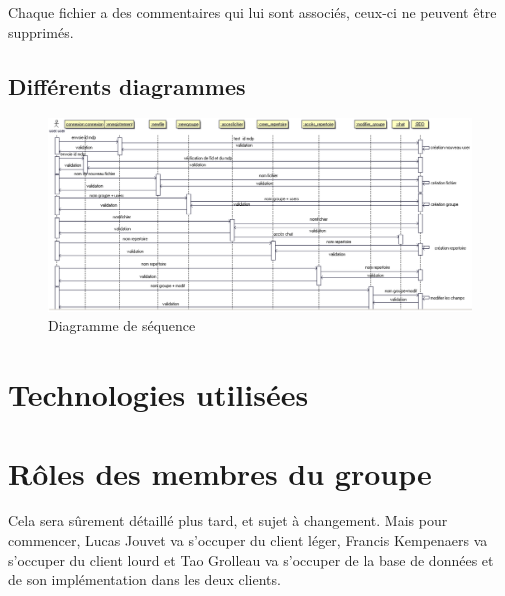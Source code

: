 \documentclass[a4paper, 12pt]{article}
\begin{document}
Chaque fichier a des commentaires qui lui sont associés, ceux-ci ne peuvent être supprimés.

\subsection{Différents diagrammes}
\begin{figure}
\begin{center}
\includegraphics[scale=0.4]{sequence.pdf}
\end{center}
\caption{Diagramme de séquence}
\end{figure}
\section{Technologies utilisées}

\section{Rôles des membres du groupe}

Cela sera sûrement détaillé plus tard, et sujet à changement.
Mais pour commencer, Lucas Jouvet va s'occuper du client léger, Francis Kempenaers va s'occuper du client lourd et Tao Grolleau va s'occuper de la base de données et de son implémentation dans les deux clients.
\end{document}
